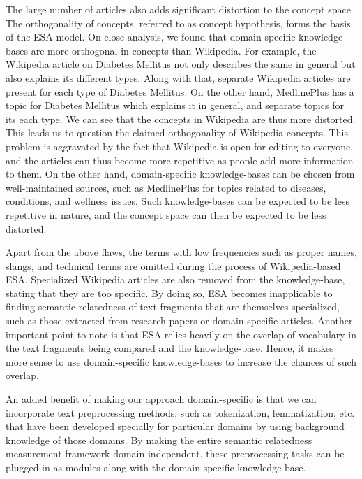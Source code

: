 \documentclass[conference]{IEEEtran}
\begin{document}
The large number of articles also adds significant distortion to the concept space. The orthogonality of concepts, referred to as concept hypothesis, forms the basis of the ESA model. On close analysis, we found that domain-specific knowledge-bases are more orthogonal in concepts than Wikipedia. For example, the Wikipedia article on Diabetes Mellitus not only describes the same in general but also explains its different types. Along with that, separate Wikipedia articles are present for each type of Diabetes Mellitus. On the other hand, MedlinePlus has a topic for Diabetes Mellitus which explains it in general, and separate topics for its each type. We can see that the concepts in Wikipedia are thus more distorted. This leads us to question the claimed orthogonality of Wikipedia concepts. This problem is aggravated by the fact that Wikipedia is open for editing to everyone, and the articles can thus become more repetitive as people add more information to them. On the other hand, domain-specific knowledge-bases can be chosen from well-maintained sources, such as MedlinePlus for topics related to diseases, conditions, and wellness issues. Such knowledge-bases can be expected to be less repetitive in nature, and the concept space can then be expected to be less distorted.

Apart from the above flaws, the terms with low frequencies such as proper names, slangs, and technical terms are omitted during the process of Wikipedia-based ESA. Specialized Wikipedia articles are also removed from the knowledge-base, stating that they are too specific. By doing so, ESA becomes inapplicable to finding semantic relatedness of text fragments that are themselves specialized, such as those extracted from research papers or domain-specific articles. Another important point to note is that ESA relies heavily on the overlap of vocabulary in the text fragments being compared and the knowledge-base. Hence, it makes more sense to use domain-specific knowledge-bases to increase the chances of such overlap.

An added benefit of making our approach domain-specific is that we can incorporate text preprocessing methods, such as tokenization, lemmatization, etc. that have been developed specially for particular domains by using background knowledge of those domains. By making the entire semantic relatedness measurement framework domain-independent, these preprocessing tasks can be plugged in as modules along with the domain-specific knowledge-base.

\end{document}
